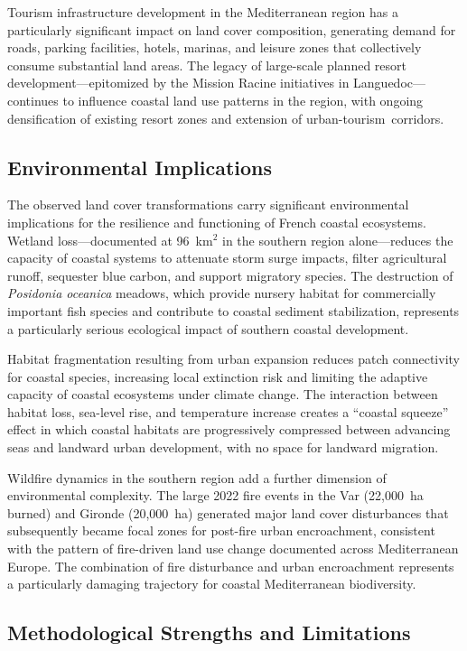 \documentclass[coasts,article,accept,pdftex,moreauthors]{Definitions/mdpi}
\begin{document}
Tourism infrastructure development in the Mediterranean region has a particularly significant impact on land cover composition, generating demand for roads, parking facilities, hotels, marinas, and leisure zones that collectively consume substantial land areas. The legacy of large-scale planned resort development—epitomized by the Mission Racine initiatives in Languedoc—continues to influence coastal land use patterns in the region, with ongoing densification of existing resort zones and extension of urban-tourism~corridors.

\subsection{Environmental Implications}

The observed land cover transformations carry significant environmental implications for the resilience and functioning of French coastal ecosystems. Wetland loss—documented at 96~km$^2$ in the southern region alone—reduces the capacity of coastal systems to attenuate storm surge impacts, filter agricultural runoff, sequester blue carbon, and support migratory species. The destruction of \textit{Posidonia oceanica} meadows, which provide nursery habitat for commercially important fish species and contribute to coastal sediment stabilization, represents a particularly serious ecological impact of southern coastal development.

Habitat fragmentation resulting from urban expansion reduces patch connectivity for coastal species, increasing local extinction risk and limiting the adaptive capacity of coastal ecosystems under climate change. The interaction between habitat loss, sea-level rise, and temperature increase creates a ``coastal squeeze'' effect in which coastal habitats are progressively compressed between advancing seas and landward urban development, with no space for landward migration.

Wildfire dynamics in the southern region add a further dimension of environmental complexity. The large 2022 fire events in the Var (22,000~ha burned) and Gironde (20,000~ha) generated major land cover disturbances that subsequently became focal zones for post-fire urban encroachment, consistent with the pattern of fire-driven land use change documented across Mediterranean Europe. The combination of fire disturbance and urban encroachment represents a particularly damaging trajectory for coastal Mediterranean biodiversity.

\subsection{Methodological Strengths and Limitations}
\end{document}
